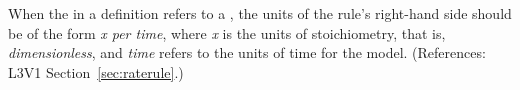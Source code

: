 When the  in a \RateRule definition refers to a \SpeciesReference,
the units of the rule's right-hand side should be of the form \emph{x per
time}, where \emph{x} is the units of stoichiometry,
that is, \emph{dimensionless},
and \emph{time} refers to the units of time for the model.  (References:
L3V1 Section~\ref{sec:raterule}.)
